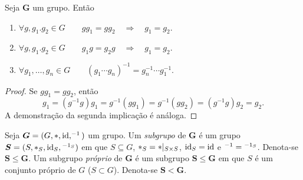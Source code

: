 \begin{prop}
	Seja $\bm G$ um grupo. Então
	\begin{enumerate}
	\item $\forall g,g_1.g_2 \in G \qquad gg_1 = gg_2 \quad \Rightarrow \quad g_1 = g_2$.
	\item $\forall g,g_1.g_2 \in G \qquad g_1g = g_2g \quad \Rightarrow \quad g_1 = g_2$.
	\item $\forall g_1,\ldots,g_n \in G \qquad (g_1 \cdots g_n)^{-1}=g_n^{-1} \cdots g_1^{-1}.$
	\end{enumerate}
\end{prop}
\begin{proof}
	Se $g g_1 = g g_2$, então
	\begin{equation*}
	g_1 = (g^{-1}g)g_1 = g^{-1}(gg_1) = g^{-1}(gg_2) = (g^{-1}g)g_2 = g_2.
	\end{equation*}
A demonstração da segunda implicação é análoga.
\end{proof}

\begin{defi}
Seja $\bm G=(G,\ast,\mathrm{id},^{-1})$ um grupo. Um \emph{subgrupo} de $\bm G$ é um grupo $\bm S=(S,\ast_S,\mathrm{id}_S,{}^{-1_S})$ em que $S \subseteq G$, $\ast_S=\ast|_{S \times S}$, $\mathrm{id}_S=\mathrm{id}$ e $^{-1} = {}^{-1_S}$. Denota-se $\bm S \leq \bm G$. Um subgrupo \emph{próprio} de $\bm G$ é um subgrupo $\bm S \leq \bm G$ em que $S$ é um conjunto próprio de $G$ ($S  \subset G$). Denota-se $\bm S < \bm G$.
\end{defi}

